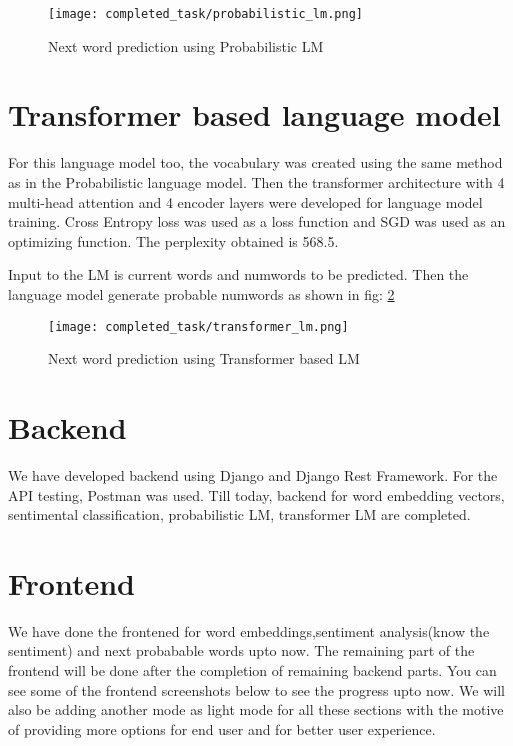 \begin{figure}[H]
	\centering
	\texttt{[image: completed\_task/probabilistic\_lm.png]}
	\caption{Next word prediction using Probabilistic LM}
	\label{fig:Next word prediction using Probabilistic LM}
\end{figure}

\section{Transformer based language model}
For this language model too, the vocabulary was created using the same method as in the Probabilistic language model. Then the transformer architecture with 4 multi-head attention and 4 encoder layers were developed for language model training. Cross Entropy loss was used as a loss function and SGD was used as an optimizing function. The perplexity obtained is 568.5.

Input to the LM is current words and  num\textunderscore words to be predicted. Then the language model generate probable num\textunderscore words as shown in fig: \ref{fig:Next word prediction using Transformer based LM}

\begin{figure}[H]
	\centering
	\texttt{[image: completed\_task/transformer\_lm.png]}
	\caption{Next word prediction using Transformer based LM}
	\label{fig:Next word prediction using Transformer based LM}
\end{figure}

\section{Backend}
We have developed backend using Django and Django Rest Framework. For the API testing, Postman was used. Till today, backend for word embedding vectors, sentimental classification, probabilistic LM, transformer LM are completed.

\section{Frontend}
We have done the frontened for word embeddings,sentiment analysis(know the sentiment) and next probabable words upto now. The remaining part of the frontend will be done after the completion of remaining backend parts. You can see some of the frontend screenshots below to see the progress upto now. We will also be adding another mode as light mode for all these sections with the motive of providing more options for end user and for better user experience.


